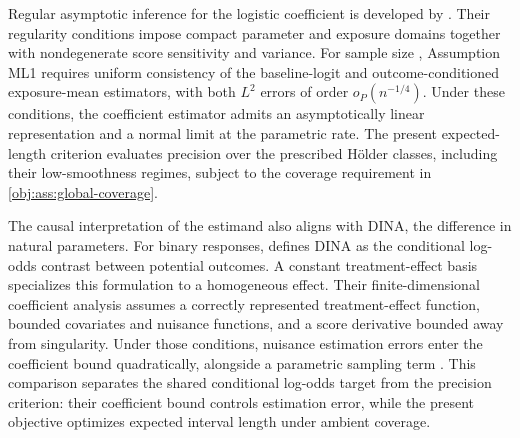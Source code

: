 Regular asymptotic inference for the logistic coefficient is developed by \citet[arXiv version 1, Assumptions REG and ML1, Theorem 2]{LiuZhangZhou2020LogisticDML}. Their regularity conditions impose compact parameter and exposure domains together with nondegenerate score sensitivity and variance. For sample size , Assumption ML1 requires uniform consistency of the baseline-logit and outcome-conditioned exposure-mean estimators, with both \(L^2\) errors of order \(o_P(n^{-1/4})\). Under these conditions, the coefficient estimator admits an asymptotically linear representation and a normal limit at the parametric rate. The present expected-length criterion evaluates precision over the prescribed Hölder classes, including their low-smoothness regimes, subject to the coverage requirement in \cref{obj:ass:global-coverage}.

The causal interpretation of the estimand also aligns with DINA, the difference in natural parameters. For binary responses, \citet[Section 2.1.1, equation (5)]{GaoHastie2025DINA} defines DINA as the conditional log-odds contrast between potential outcomes. A constant treatment-effect basis specializes this formulation to a homogeneous effect. Their finite-dimensional coefficient analysis assumes a correctly represented treatment-effect function, bounded covariates and nuisance functions, and a score derivative bounded away from singularity. Under those conditions, nuisance estimation errors enter the coefficient bound quadratically, alongside a parametric sampling term \citep[Section 3.3, Proposition 1]{GaoHastie2025DINA}. This comparison separates the shared conditional log-odds target from the precision criterion: their coefficient bound controls estimation error, while the present objective optimizes expected interval length under ambient coverage.

